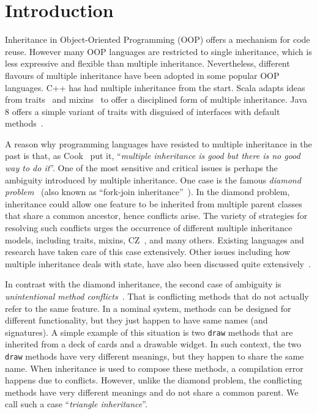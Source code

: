 \section{Introduction}
Inheritance in Object-Oriented Programming (OOP) offers a mechanism
for code reuse. However many OOP languages are restricted to single
inheritance, which is less expressive and flexible than multiple
inheritance. Nevertheless, different flavours of multiple inheritance
have been adopted in some popular OOP languages. C++ has had 
multiple inheritance from the start. Scala adapts ideas from traits~\cite{scharli03traits} 
and mixins~\cite{bracha90mixin} to offer a disciplined form of multiple inheritance. Java 8 
offers a simple variant of traits with disguised of interfaces with default methods~\cite{goetz12fdefenders}.

A reason why programming languages have resisted to multiple
inheritance in the past is that, as Cook~\cite{Cook1987} put it, 
``\emph{multiple inheritance is good but there is no good way to do it}''.
One of the most sensitive and critical issues is perhaps the ambiguity
introduced by multiple inheritance. One case is the famous
\textit{diamond problem}~\cite{Sak89dis,Singh1995} (also known as ``fork-join inheritance''~\cite{Sak89dis}). 
In the diamond problem, inheritance could allow
one feature to be inherited from multiple parent classes that share a
common ancestor, hence
conflicts arise. The variety of strategies for resolving such conflicts
urges the occurrence of different multiple inheritance models,
including traits, mixins, CZ~\cite{malayeri2009cz}, and many others. Existing
languages and research have taken care of this case extensively. Other issues
including how multiple inheritance deals with state, 
have also been discussed quite extensively~\cite{classless,malayeri2009cz,stroustrup1995}.

In contrast with the diamond inheritance, the second case of ambiguity
is \textit{unintentional method conflicts}~\cite{scharli03traits}. That is conflicting 
methods that do not actually refer to the same feature. 
In a nominal system, methods can be designed for different
functionality, but they just happen to have same names (and
signatures).
A simple example of this situation is two \lstinline{draw} methods that
are inherited from a deck of cards and a drawable widget. 
In such context, the two \lstinline{draw} methods have very different meanings, 
but they happen to share the same name.
When inheritance is used to compose these methods, a compilation 
error happens due to conflicts. However, unlike the diamond problem,
the conflicting methods have very different meanings and do not share a
common parent. We call such a case ``\textit{triangle inheritance}''.

